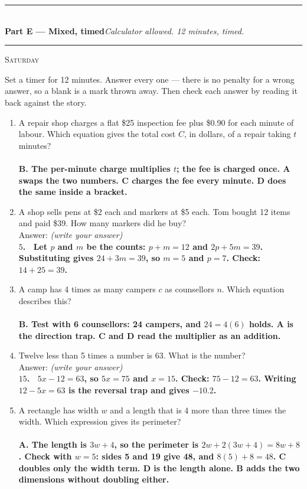 \documentclass[11pt,a4paper]{article}
\newif\ifANSWERS
\newcommand{\PartHead}[2]{%
  \vspace{6pt}
  {\color{navy}\rule{\textwidth}{0.8pt}}\\[2pt]
  {\large\bfseries\color{navy}#1}\hfill{\small\itshape #2}\\[-4pt]
  {\color{navy}\rule{\textwidth}{0.4pt}}
  \vspace{4pt}
}
\newcommand{\sitting}[1]{{\footnotesize\textsc{\color{navy}#1}}\par\vspace{2pt}}
\newcommand{\spr}{\\[3pt]\hspace*{6pt}Answer: \underline{\hspace{3.2cm}}\hfill{\footnotesize\itshape(write your answer)}}
\newcommand{\ans}[1]{\ {\color{keyred}\bfseries #1}}
\newcommand{\ans}[1]{}
\begin{document}
\ifANSWERS\else\newpage\fi
\PartHead{Part E --- Mixed, timed}{Calculator allowed. 12 minutes, timed.}
\sitting{Saturday}
Set a timer for 12 minutes. Answer every one --- there is no penalty for a wrong answer,
so a blank is a mark thrown away. Then check each answer by reading it back against the
story.

\begin{enumerate}[leftmargin=20pt,itemsep=9pt]
\item A repair shop charges a flat \$25 inspection fee plus \$0.90 for each minute of
  labour. Which equation gives the total cost $C$, in dollars, of a repair taking $t$
  minutes?\\
  \ans{\\ B. The per-minute charge multiplies $t$; the fee is charged once. A swaps the
  two numbers. C charges the fee every minute. D does the same inside a bracket.}

\item A shop sells pens at \$2 each and markers at \$5 each. Tom bought 12 items and
  paid \$39. How many markers did he buy? \spr
  \ans{\\ $5$. \ Let $p$ and $m$ be the counts: $p+m=12$ and $2p+5m=39$. Substituting
  gives $24+3m=39$, so $m=5$ and $p=7$. Check: $14+25=39$.}

\item A camp has 4 times as many campers $c$ as counsellors $n$. Which equation
  describes this?\\
  \ans{\\ B. Test with 6 counsellors: 24 campers, and $24=4(6)$ holds. A is the
  direction trap. C and D read the multiplier as an addition.}

\item Twelve less than 5 times a number is 63. What is the number? \spr
  \ans{\\ $15$. \ $5x-12=63$, so $5x=75$ and $x=15$. Check: $75-12=63$. Writing
  $12-5x=63$ is the reversal trap and gives $-10.2$.}

\item A rectangle has width $w$ and a length that is 4 more than three times the width.
  Which expression gives its perimeter?\\
  \ans{\\ A. The length is $3w+4$, so the perimeter is $2w+2(3w+4)=8w+8$. Check with
  $w=5$: sides 5 and 19 give 48, and $8(5)+8=48$. C doubles only the width term.
  D is the length alone. B adds the two dimensions without doubling either.}


\end{enumerate}
\end{document}
